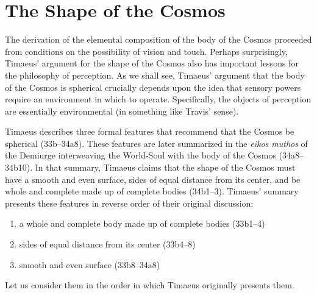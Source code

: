 
\section{The Shape of the Cosmos} %
\label{sec:the_shape_of_the_Cosmos}

The derivation of the elemental composition of the body of the Cosmos proceeded from conditions on the possibility of vision and touch. Perhaps surprisingly, Timaeus' argument for the shape of the Cosmos also has important lessons for the philosophy of perception. As we shall see, Timaeus' argument that the body of the Cosmos is spherical crucially depends upon the idea that sensory powers require an environment in which to operate. Specifically, the objects of perception are essentially environmental (in something like Travis' \citeyear{Travis:2005ys} sense). 

Timaeus describes three formal features that recommend that the Cosmos be spherical (33b--34a8). These features are later summarized in the \emph{eikos muthos} of the Demiurge interweaving the World-Soul with the body of the Cosmos (34a8--34b10). In that summary, Timaeus claims that the shape of the Cosmos must have a smooth and even surface, sides of equal distance from its center, and be whole and complete made up of complete bodies (34b1--3). Timaeus' summary presents these features in reverse order of their original discussion:
\begin{enumerate}[(1)]
	\item a whole and complete body made up of complete bodies (33b1--4)
	\item sides of equal distance from its center (33b4--8)
	\item smooth and even surface (33b8--34a8)
\end{enumerate}
Let us consider them in the order in which Timaeus originally presents them.

